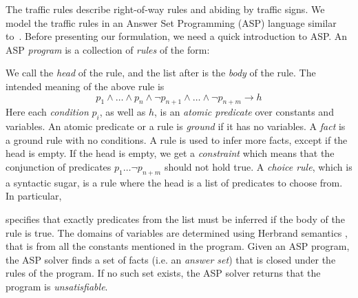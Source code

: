 The traffic rules describe right-of-way rules and abiding by traffic signs.
%
We model the traffic rules in an Answer Set Programming (ASP) language similar to~\cite{Karimi.2020}.
%
Before presenting our formulation, we need a quick introduction to ASP.
%
An ASP \emph{program} is a collection of \emph{rules} of the form:
\begin{center}
\end{center}
%
We call  the \emph{head} of the rule, and the list after \clingo{:-} is the \emph{body} of the rule.
%
The intended meaning of the above rule is
$$ p_1 \land \dots \land p_n \land  \neg p_{n+1} \land \dots \land \neg p_{n+m} \rightarrow h $$
%
Here each \emph{condition} $p_i$, as well as $h$, is an \emph{atomic predicate} over constants and variables.
%
An atomic predicate or a rule is \emph{ground} if it has no variables.
%
A \emph{fact} is a ground rule with no conditions.
%
A rule is used to infer more facts, except if the head is empty.
%
If the head is empty, we get a \emph{constraint} which means that the conjunction of predicates $p_1 \ldots \neg p_{n+m}$ should not hold true.
%
A \emph{choice rule}, which is a syntactic sugar, is a rule where the head is a list of predicates to choose from.
%
In particular,
\begin{center}
\end{center}
specifies that exactly  predicates from the list  must be inferred if the body of the rule is true.
%
The domains of variables are determined using Herbrand semantics \cite{Herbrand.2019}, that is from all the constants mentioned in the program.
%
Given an ASP program, the ASP solver finds a set of facts (i.e. an \emph{answer set}) that is closed under the rules of the program.
%
If no such set exists, the ASP solver returns that the program is \emph{unsatisfiable}.



